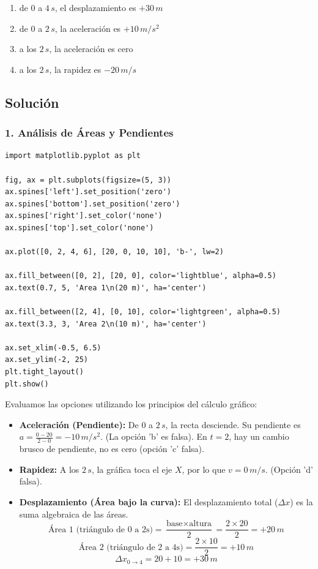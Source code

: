 \documentclass[12pt, a4paper]{article}
\begin{document}
\begin{enumerate}[label=\alph*)]
    \item de $0$ a $4\,\si{s}$, el desplazamiento es $+30\,\si{m}$
    \item de $0$ a $2\,\si{s}$, la aceleración es $+10\,\si{m/s^2}$
    \item a los $2\,\si{s}$, la aceleración es cero
    \item a los $2\,\si{s}$, la rapidez es $-20\,\si{m/s}$
\end{enumerate}

\subsection*{Solución}

\subsubsection*{1. Análisis de Áreas y Pendientes}

\begin{lstlisting}
import matplotlib.pyplot as plt

fig, ax = plt.subplots(figsize=(5, 3))
ax.spines['left'].set_position('zero')
ax.spines['bottom'].set_position('zero')
ax.spines['right'].set_color('none')
ax.spines['top'].set_color('none')

ax.plot([0, 2, 4, 6], [20, 0, 10, 10], 'b-', lw=2)

ax.fill_between([0, 2], [20, 0], color='lightblue', alpha=0.5)
ax.text(0.7, 5, 'Area 1\n(20 m)', ha='center')

ax.fill_between([2, 4], [0, 10], color='lightgreen', alpha=0.5)
ax.text(3.3, 3, 'Area 2\n(10 m)', ha='center')

ax.set_xlim(-0.5, 6.5)
ax.set_ylim(-2, 25)
plt.tight_layout()
plt.show()
\end{lstlisting}

Evaluamos las opciones utilizando los principios del cálculo gráfico:
\begin{itemize}
    \item \textbf{Aceleración (Pendiente):} De $0$ a $2\,\si{s}$, la recta desciende. Su pendiente es $a = \frac{0 - 20}{2 - 0} = -10\,\si{m/s^2}$. (La opción 'b' es falsa). En $t=2$, hay un cambio brusco de pendiente, no es cero (opción 'c' falsa).
    \item \textbf{Rapidez:} A los $2\,\si{s}$, la gráfica toca el eje $X$, por lo que $v = 0\,\si{m/s}$. (Opción 'd' falsa).
    \item \textbf{Desplazamiento (Área bajo la curva):} El desplazamiento total ($\Delta x$) es la suma algebraica de las áreas.
    $$ \text{Área 1 (triángulo de 0 a 2s)} = \frac{\text{base} \times \text{altura}}{2} = \frac{2 \times 20}{2} = +20\,\si{m} $$
    $$ \text{Área 2 (triángulo de 2 a 4s)} = \frac{2 \times 10}{2} = +10\,\si{m} $$
    $$ \Delta x_{0\to4} = 20 + 10 = +30\,\si{m} $$
\end{itemize}
\end{document}
